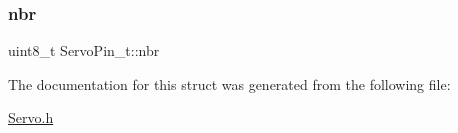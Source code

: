 \mbox{\label{struct_servo_pin__t_ad2ff0e34820e04a276e38d359021b03c}} 
\subsubsection{\texorpdfstring{nbr}{nbr}}
{\footnotesize\ttfamily uint8\+\_\+t Servo\+Pin\+\_\+t\+::nbr}



The documentation for this struct was generated from the following file\+:\begin{DoxyCompactItemize}
\item 
\hyperlink{_servo_8h}{Servo.\+h}\end{DoxyCompactItemize}

